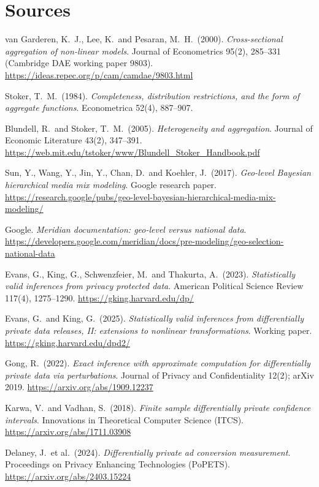\section*{Sources}
\begingroup\raggedright
\begin{enumerate}[label={[\arabic*]},leftmargin=2.5em]
\item van Garderen, K.\ J., Lee, K.\ and Pesaran, M.\ H.\ (2000). \emph{Cross-sectional aggregation of non-linear models}. Journal of Econometrics 95(2), 285--331 (Cambridge DAE working paper 9803). \url{https://ideas.repec.org/p/cam/camdae/9803.html}
\item Stoker, T.\ M.\ (1984). \emph{Completeness, distribution restrictions, and the form of aggregate functions}. Econometrica 52(4), 887--907.
\item Blundell, R.\ and Stoker, T.\ M.\ (2005). \emph{Heterogeneity and aggregation}. Journal of Economic Literature 43(2), 347--391. \url{https://web.mit.edu/tstoker/www/Blundell_Stoker_Handbook.pdf}
\item Sun, Y., Wang, Y., Jin, Y., Chan, D.\ and Koehler, J.\ (2017). \emph{Geo-level Bayesian hierarchical media mix modeling}. Google research paper. \url{https://research.google/pubs/geo-level-bayesian-hierarchical-media-mix-modeling/}
\item Google. \emph{Meridian documentation: geo-level versus national data}. \url{https://developers.google.com/meridian/docs/pre-modeling/geo-selection-national-data}
\item Evans, G., King, G., Schwenzfeier, M.\ and Thakurta, A.\ (2023). \emph{Statistically valid inferences from privacy protected data}. American Political Science Review 117(4), 1275--1290. \url{https://gking.harvard.edu/dp/}
\item Evans, G.\ and King, G.\ (2025). \emph{Statistically valid inferences from differentially private data releases, II: extensions to nonlinear transformations}. Working paper. \url{https://gking.harvard.edu/dpd2/}
\item Gong, R.\ (2022). \emph{Exact inference with approximate computation for differentially private data via perturbations}. Journal of Privacy and Confidentiality 12(2); arXiv 2019. \url{https://arxiv.org/abs/1909.12237}
\item Karwa, V.\ and Vadhan, S.\ (2018). \emph{Finite sample differentially private confidence intervals}. Innovations in Theoretical Computer Science (ITCS). \url{https://arxiv.org/abs/1711.03908}
\item Delaney, J.\ et al.\ (2024). \emph{Differentially private ad conversion measurement}. Proceedings on Privacy Enhancing Technologies (PoPETS). \url{https://arxiv.org/abs/2403.15224}

\end{enumerate}
